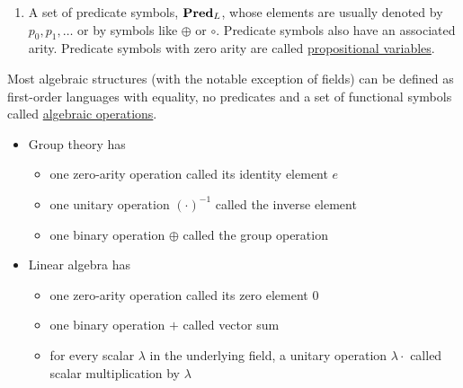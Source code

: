 \begin{definition}
\begin{description}
\begin{enumerate}
      \item A set of predicate symbols, $\operatorname{\mathbf{Pred}}_L$, whose elements are usually denoted by $p_0, p_1, \ldots$ or by symbols like $\oplus$ or $\circ$. Predicate symbols also have an associated arity. Predicate symbols with zero arity are called \uline{propositional variables}.
    \end{enumerate}
  \end{description}
\end{definition}

\begin{example}\label{ex:algebraic_theory_language}\cite[remark 2.1.4]{Leinster2014}
  Most algebraic structures (with the notable exception of fields) can be defined as first-order languages with equality, no predicates and a set of functional symbols called \uline{algebraic operations}.
  \begin{itemize}
    \item Group theory has
    \begin{itemize}
      \item one zero-arity operation called its identity element $e$
      \item one unitary operation $(\cdot)^{-1}$ called the inverse element
      \item one binary operation $\oplus$ called the group operation
    \end{itemize}

    \item Linear algebra has
    \begin{itemize}
      \item one zero-arity operation called its zero element $0$
      \item one binary operation $+$ called vector sum
      \item for every scalar $\lambda$ in the underlying field, a unitary operation $\lambda \cdot$ called scalar multiplication by $\lambda$
    \end{itemize}
  \end{itemize}
\end{example}

